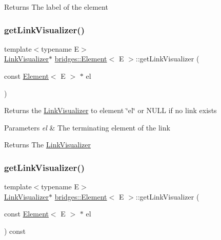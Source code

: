\begin{DoxyReturn}{Returns}
The label of the element 
\end{DoxyReturn}
\hypertarget{classbridges_1_1_element_aa8dd91d04c22c697f7c500a18642282f}{}\label{classbridges_1_1_element_aa8dd91d04c22c697f7c500a18642282f} 
\subsubsection{\texorpdfstring{get\+Link\+Visualizer()}{getLinkVisualizer()}\hspace{0.1cm}{\footnotesize\ttfamily [1/2]}}
{\footnotesize\ttfamily template$<$typename E$>$ \\
\hyperlink{classbridges_1_1_link_visualizer}{Link\+Visualizer}$\ast$ \hyperlink{classbridges_1_1_element}{bridges\+::\+Element}$<$ E $>$\+::get\+Link\+Visualizer (\begin{DoxyParamCaption}\item[{const \hyperlink{classbridges_1_1_element}{Element}$<$ E $>$ $\ast$}]{el }\end{DoxyParamCaption})\hspace{0.3cm}{\ttfamily [inline]}}

Returns the \hyperlink{classbridges_1_1_link_visualizer}{Link\+Visualizer} to element \char`\"{}el\char`\"{} or N\+U\+LL if no link exists


\begin{DoxyParams}{Parameters}
{\em el} & The terminating element of the link\\
\hline
\end{DoxyParams}
\begin{DoxyReturn}{Returns}
The \hyperlink{classbridges_1_1_link_visualizer}{Link\+Visualizer} 
\end{DoxyReturn}
\hypertarget{classbridges_1_1_element_a202553f482b9a49057c8c87a368cc93a}{}\label{classbridges_1_1_element_a202553f482b9a49057c8c87a368cc93a} 
\subsubsection{\texorpdfstring{get\+Link\+Visualizer()}{getLinkVisualizer()}\hspace{0.1cm}{\footnotesize\ttfamily [2/2]}}
{\footnotesize\ttfamily template$<$typename E$>$ \\
\hyperlink{classbridges_1_1_link_visualizer}{Link\+Visualizer}$\ast$ \hyperlink{classbridges_1_1_element}{bridges\+::\+Element}$<$ E $>$\+::get\+Link\+Visualizer (\begin{DoxyParamCaption}\item[{const \hyperlink{classbridges_1_1_element}{Element}$<$ E $>$ $\ast$}]{el }\end{DoxyParamCaption}) const\hspace{0.3cm}{\ttfamily [inline]}}

